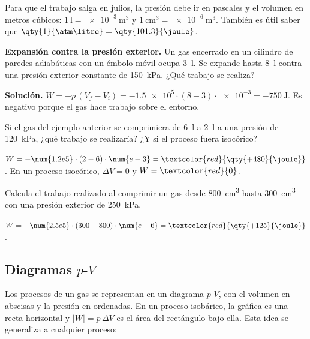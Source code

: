 \begin{remark}
    Para que el trabajo salga en julios, la presión debe ir en pascales y el volumen en metros cúbicos:
    \(\qty{1}{\litre} = \qty{e-3}{\m\cubed}\) y \(\qty{1}{\cm\cubed} = \qty{e-6}{\m\cubed}\). También es útil saber que
    \(\qty{1}{\atm\litre} = \qty{101.3}{\joule}\).
\end{remark}

\begin{example}
    \textbf{Expansión contra la presión exterior.} Un gas encerrado en un cilindro de paredes adiabáticas con un émbolo móvil ocupa
    \qty{3}{\litre}. Se expande hasta \qty{8}{\litre} contra una presión exterior constante de \qty{150}{\kilo\pascal}. ¿Qué trabajo
    se realiza?

    \textbf{Solución.} \(W = -p\,(V_f - V_i) = -\num{1.5e5} \cdot (8 - 3) \cdot \num{e-3} = \qty{-750}{\joule}\). Es negativo porque
    el gas hace trabajo sobre el entorno.
\end{example}

\begin{exercise}
    Si el gas del ejemplo anterior se comprimiera de \qty{6}{\litre} a \qty{2}{\litre} a una presión de \qty{120}{\kilo\pascal}, ¿qué
    trabajo se realizaría? ¿Y si el proceso fuera isocórico?
    \begin{solu}
        \(W = -\num{1.2e5} \cdot (2 - 6) \cdot \num{e-3} = \textcolor{red}{\qty{+480}{\joule}}\). En un proceso isocórico,
        \(\Delta V = 0\) y \(W = \textcolor{red}{0}\).
    \end{solu}
\end{exercise}

\begin{exercise}
    Calcula el trabajo realizado al comprimir un gas desde \qty{800}{\cm\cubed} hasta \qty{300}{\cm\cubed} con una presión exterior
    de \qty{250}{\kilo\pascal}.
    \begin{solu}
        \(W = -\num{2.5e5} \cdot (300 - 800) \cdot \num{e-6} = \textcolor{red}{\qty{+125}{\joule}}\).
    \end{solu}
\end{exercise}

\subsection{Diagramas \texorpdfstring{\(p\)-\(V\)}{p-V}}

Los procesos de un gas se representan en un diagrama \(p\)-\(V\), con el volumen en abscisas y la presión en ordenadas. En un
proceso isobárico, la gráfica es una recta horizontal y \(|W| = p\,\Delta V\) es el área del rectángulo bajo ella. Esta idea se
generaliza a cualquier proceso:

